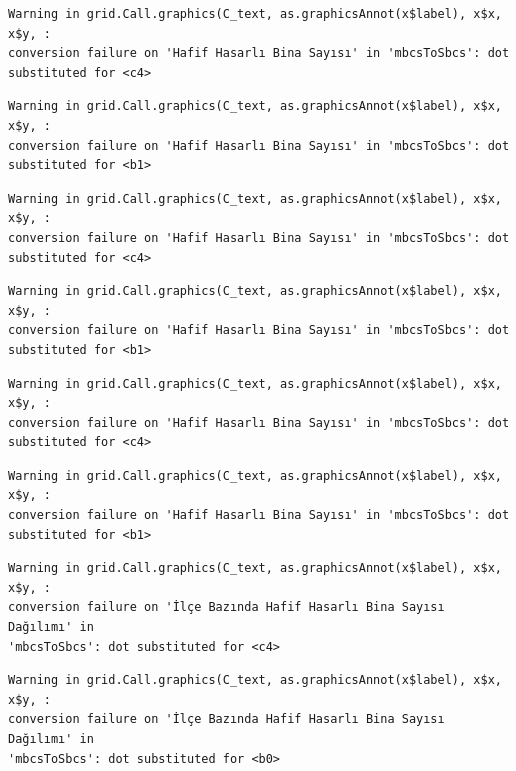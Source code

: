 \documentclass[
  11pt,
  a4paper,
  DIV=11,
  numbers=noendperiod]{scrartcl}
\begin{document}
\begin{verbatim}
Warning in grid.Call.graphics(C_text, as.graphicsAnnot(x$label), x$x, x$y, :
conversion failure on 'Hafif Hasarlı Bina Sayısı' in 'mbcsToSbcs': dot
substituted for <c4>
\end{verbatim}

\begin{verbatim}
Warning in grid.Call.graphics(C_text, as.graphicsAnnot(x$label), x$x, x$y, :
conversion failure on 'Hafif Hasarlı Bina Sayısı' in 'mbcsToSbcs': dot
substituted for <b1>
\end{verbatim}

\begin{verbatim}
Warning in grid.Call.graphics(C_text, as.graphicsAnnot(x$label), x$x, x$y, :
conversion failure on 'Hafif Hasarlı Bina Sayısı' in 'mbcsToSbcs': dot
substituted for <c4>
\end{verbatim}

\begin{verbatim}
Warning in grid.Call.graphics(C_text, as.graphicsAnnot(x$label), x$x, x$y, :
conversion failure on 'Hafif Hasarlı Bina Sayısı' in 'mbcsToSbcs': dot
substituted for <b1>
\end{verbatim}

\begin{verbatim}
Warning in grid.Call.graphics(C_text, as.graphicsAnnot(x$label), x$x, x$y, :
conversion failure on 'Hafif Hasarlı Bina Sayısı' in 'mbcsToSbcs': dot
substituted for <c4>
\end{verbatim}

\begin{verbatim}
Warning in grid.Call.graphics(C_text, as.graphicsAnnot(x$label), x$x, x$y, :
conversion failure on 'Hafif Hasarlı Bina Sayısı' in 'mbcsToSbcs': dot
substituted for <b1>
\end{verbatim}

\begin{verbatim}
Warning in grid.Call.graphics(C_text, as.graphicsAnnot(x$label), x$x, x$y, :
conversion failure on 'İlçe Bazında Hafif Hasarlı Bina Sayısı Dağılımı' in
'mbcsToSbcs': dot substituted for <c4>
\end{verbatim}

\begin{verbatim}
Warning in grid.Call.graphics(C_text, as.graphicsAnnot(x$label), x$x, x$y, :
conversion failure on 'İlçe Bazında Hafif Hasarlı Bina Sayısı Dağılımı' in
'mbcsToSbcs': dot substituted for <b0>
\end{verbatim}
\end{document}
